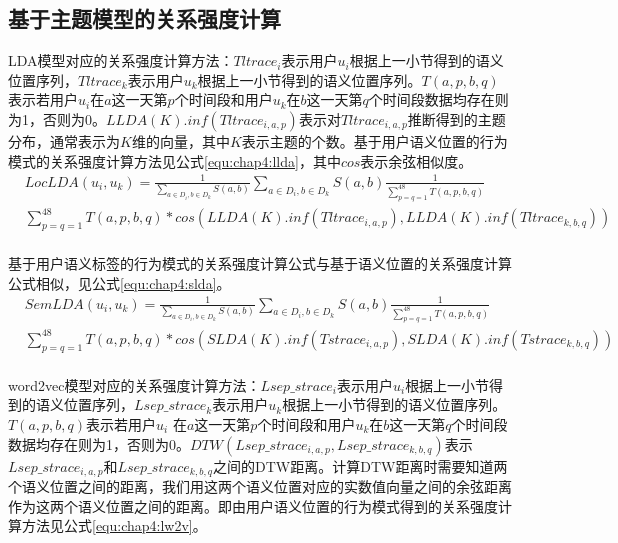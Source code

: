 \subsection{基于主题模型的关系强度计算}
LDA模型对应的关系强度计算方法：$Tltrace_{i}$表示用户$u_{i}$根据上一小节得到的语义位置序列，$Tltrace_{k}$表示用户$u_{k}$根据上一小节得到的语义位置序列。$T(a,p,b,q)$表示若用户$u_{i}$在$a$这一天第$p$个时间段和用户$u_{k}$在$b$这一天第$q$个时间段数据均存在则为1，否则为0。$LLDA(K).inf(Tltrace_{i,a,p})$表示对$Tltrace_{i,a,p}$推断得到的主题分布，通常表示为$K$维的向量，其中$K$表示主题的个数。基于用户语义位置的行为模式的关系强度计算方法见公式\ref{equ:chap4:llda}，其中$cos$表示余弦相似度。
\begin{equation}
\label{equ:chap4:llda}
\begin{split}
&LocLDA(u_{i},u_{k})=\frac{1}{\sum_{a\in D_{i},b\in D_{k}}S(a,b)}\sum_{a\in D_{i},b\in D_{k}}S(a,b)\frac{1}{\sum_{p=q=1}^{48}T(a,p,b,q)}\\
&\sum_{p=q=1}^{48}T(a,p,b,q)\ast cos⁡(LLDA(K).inf(Tltrace_{i,a,p} ),LLDA(K).inf(Tltrace_{k,b,q}))\\
\end{split}
\end{equation}
\par 基于用户语义标签的行为模式的关系强度计算公式与基于语义位置的关系强度计算公式相似，见公式\ref{equ:chap4:slda}。
\begin{equation}
\label{equ:chap4:slda}
\begin{split}
&SemLDA(u_{i},u_{k})=\frac{1}{\sum_{a\in D_{i},b\in D_{k}}S(a,b)}\sum_{a\in D_{i},b\in D_{k}}S(a,b)\frac{1}{\sum_{p=q=1}^{48}T(a,p,b,q)}\\
&\sum_{p=q=1}^{48}T(a,p,b,q)\ast cos⁡(SLDA(K).inf(Tstrace_{i,a,p}),SLDA(K).inf(Tstrace_{k,b,q}))\\
\end{split}
\end{equation}
\par word2vec模型对应的关系强度计算方法：$Lsep\_strace_{i}$表示用户$u_{i}$根据上一小节得到的语义位置序列，$Lsep\_strace_{k}$表示用户$u_{k}$根据上一小节得到的语义位置序列。$T(a,p,b,q)$表示若用户$u_{i}$ 在$a$这一天第$p$个时间段和用户$u_{k}$在$b$这一天第$q$个时间段数据均存在则为1，否则为0。$DTW(Lsep\_strace_{i,a,p},Lsep\_strace_{k,b,q})$表示$Lsep\_strace_{i,a,p}$和$Lsep\_strace_{k,b,q}$之间的DTW距离。计算DTW距离时需要知道两个语义位置之间的距离，我们用这两个语义位置对应的实数值向量之间的余弦距离作为这两个语义位置之间的距离。即由用户语义位置的行为模式得到的关系强度计算方法见公式\ref{equ:chap4:lw2v}。
